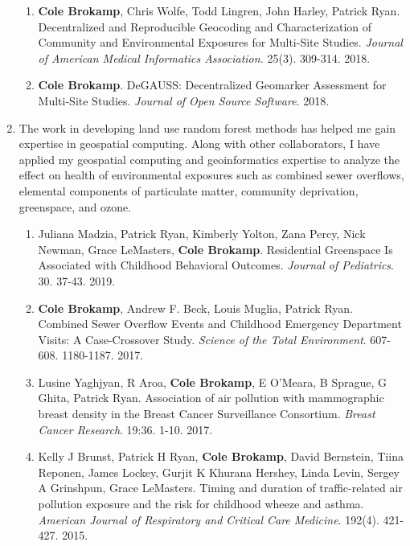 \documentclass{nihbiosketch}
\begin{document}
\begin{enumerate}
\begin{enumerate}
	
	\item \textbf{Cole Brokamp}, Chris Wolfe, Todd Lingren, John Harley, Patrick Ryan. Decentralized and Reproducible Geocoding and Characterization of Community and Environmental Exposures for Multi-Site Studies. \textit{Journal of American Medical Informatics Association.} 25(3). 309-314. 2018.
	
	\item \textbf{Cole Brokamp}. DeGAUSS: Decentralized Geomarker Assessment for Multi-Site Studies. \textit{Journal of Open Source Software}. 2018. 
	
\end{enumerate}

\item The work in developing land use random forest methods has helped me gain expertise in geospatial computing.  Along with other collaborators, I have applied my geospatial computing and geoinformatics expertise to analyze the effect on health of environmental exposures such as combined sewer overflows, elemental components of particulate matter, community deprivation, greenspace, and ozone.

\begin{enumerate}

 \item Juliana Madzia, Patrick Ryan, Kimberly Yolton, Zana Percy, Nick Newman, Grace
LeMasters, \textbf{Cole Brokamp}. Residential Greenspace Is Associated with Childhood
Behavioral Outcomes. \textit{Journal of Pediatrics}. 30. 37-43. 2019.

	\item \textbf{Cole Brokamp}, Andrew F. Beck, Louis Muglia, Patrick Ryan. Combined Sewer Overflow Events and Childhood Emergency Department Visits: A Case-Crossover Study. \textit{Science of the Total Environment}. 607-608. 1180-1187. 2017.
	
	\item Lusine Yaghjyan, R Aroa, \textbf{Cole Brokamp}, E O'Meara, B Sprague, G Ghita, Patrick Ryan. Association of air pollution with mammographic breast density in the Breast Cancer Surveillance Consortium. \textit{Breast Cancer Research}. 19:36. 1-10. 2017.
	
	\item Kelly J Brunst, Patrick H Ryan, \textbf{Cole Brokamp}, David Bernstein, Tiina Reponen, James Lockey, Gurjit K Khurana Hershey, Linda Levin, Sergey A Grinshpun, Grace LeMasters. Timing and duration of traffic-related air pollution exposure and the risk for childhood wheeze and asthma. \textit{American Journal of Respiratory and Critical Care Medicine}. 192(4). 421-427. 2015.
	

\end{enumerate}
\end{enumerate}
\end{document}
